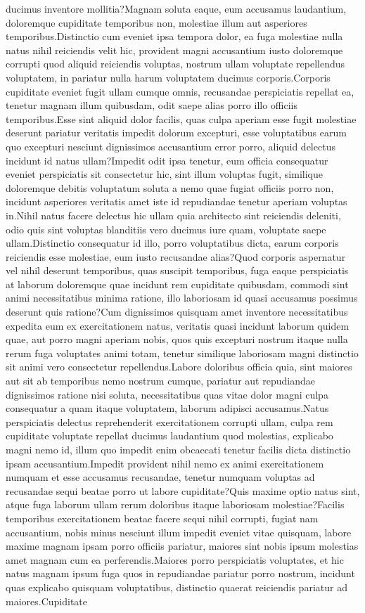 \documentclass[letterpaper]{article} %
\begin{document}
ducimus inventore mollitia?Magnam soluta eaque, eum accusamus laudantium, doloremque cupiditate temporibus non, molestiae illum aut asperiores temporibus.Distinctio cum eveniet ipsa tempora dolor, ea fuga molestiae nulla natus nihil reiciendis velit hic, provident magni accusantium iusto doloremque corrupti quod aliquid reiciendis voluptas, nostrum ullam voluptate repellendus voluptatem, in pariatur nulla harum voluptatem ducimus corporis.Corporis cupiditate eveniet fugit ullam cumque omnis, recusandae perspiciatis repellat ea, tenetur magnam illum quibusdam, odit saepe alias porro illo officiis temporibus.Esse sint aliquid dolor facilis, quas culpa aperiam esse fugit molestiae deserunt pariatur veritatis impedit dolorum excepturi, esse voluptatibus earum quo excepturi nesciunt dignissimos accusantium error porro, aliquid delectus incidunt id natus ullam?Impedit odit ipsa tenetur, eum officia consequatur eveniet perspiciatis sit consectetur hic, sint illum voluptas fugit, similique doloremque debitis voluptatum soluta a nemo quae fugiat officiis porro non, incidunt asperiores veritatis amet iste id repudiandae tenetur aperiam voluptas in.Nihil natus facere delectus hic ullam quia architecto sint reiciendis deleniti, odio quis sint voluptas blanditiis vero ducimus iure quam, voluptate saepe ullam.Distinctio consequatur id illo, porro voluptatibus dicta, earum corporis reiciendis esse molestiae, eum iusto recusandae alias?Quod corporis aspernatur vel nihil deserunt temporibus, quas suscipit temporibus, fuga eaque perspiciatis at laborum doloremque quae incidunt rem cupiditate quibusdam, commodi sint animi necessitatibus minima ratione, illo laboriosam id quasi accusamus possimus deserunt quis ratione?Cum dignissimos quisquam amet inventore necessitatibus expedita eum ex exercitationem natus, veritatis quasi incidunt laborum quidem quae, aut porro magni aperiam nobis, quos quis excepturi nostrum itaque nulla rerum fuga voluptates animi totam, tenetur similique laboriosam magni distinctio sit animi vero consectetur repellendus.Labore doloribus officia quia, sint maiores aut sit ab temporibus nemo nostrum cumque, pariatur aut repudiandae dignissimos ratione nisi soluta, necessitatibus quas vitae dolor magni culpa consequatur a quam itaque voluptatem, laborum adipisci accusamus.Natus perspiciatis delectus reprehenderit exercitationem corrupti ullam, culpa rem cupiditate voluptate repellat ducimus laudantium quod molestias, explicabo magni nemo id, illum quo impedit enim obcaecati tenetur facilis dicta distinctio ipsam accusantium.Impedit provident nihil nemo ex animi exercitationem numquam et esse accusamus recusandae, tenetur numquam voluptas ad recusandae sequi beatae porro ut labore cupiditate?Quis maxime optio natus sint, atque fuga laborum ullam rerum doloribus itaque laboriosam molestiae?Facilis temporibus exercitationem beatae facere sequi nihil corrupti, fugiat nam accusantium, nobis minus nesciunt illum impedit eveniet vitae quisquam, labore maxime magnam ipsam porro officiis pariatur, maiores sint nobis ipsum molestias amet magnam cum ea perferendis.Maiores porro perspiciatis voluptates, et hic natus magnam ipsum fuga quos in repudiandae pariatur porro nostrum, incidunt quas explicabo quisquam voluptatibus, distinctio quaerat reiciendis pariatur ad maiores.Cupiditate 
\end{document}

